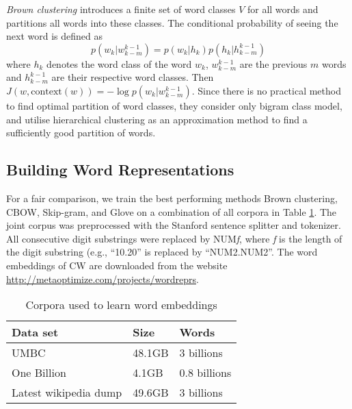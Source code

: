 \textit{Brown clustering} introduces a finite set of word classes $V$ for all words and partitions all words into these classes. The conditional probability of seeing the next word is defined as
\begin{equation}
p(w_k | w_{k - m}^{k -1}) = p(w_k | h_k) p(h_k | h_{k - m}^{k -1})
\end{equation}
where $h_k$ denotes the word class of the word $w_k$, $w_{k - m}^{k -1}$ are the previous $m$ words and $h_{k - m}^{k -1}$ are their respective word classes. Then $J(w, \text{context}(w)) = - \log p(w_k | w_{k - m}^{k -1}) $. Since there is no practical method to find optimal partition of word classes, they consider only bigram class model, and utilise hierarchical clustering as an approximation method to find a sufficiently good partition of words. 

\subsection{Building Word Representations}
\label{buildingWordRep}
For a fair comparison, we train the best performing methods Brown clustering, CBOW, Skip-gram, and Glove on a combination of all corpora in Table \ref{wordEmbedCorpora}. The joint corpus was preprocessed with the Stanford sentence splitter and tokenizer. All consecutive digit substrings were replaced by NUM\textit{f}, where \textit{f} is the length of the digit substring (e.g., ``10.20'' is replaced by ``NUM2.NUM2''. The word embeddings of CW are downloaded from the website \url{http://metaoptimize.com/projects/wordreprs}.

\begin{table}[h]
\begin{center}
\begin{small}
\begin{tabular}{lll}
\hline
\textbf{Data set} & \textbf{Size} & \textbf{Words} \\ \hline
UMBC 	& 48.1GB & 3 billions \\
One Billion 	& 4.1GB & 0.8 billions  \\
Latest wikipedia dump & 49.6GB & 3 billions \\ \hline
\end{tabular}
\end{small}
\caption{Corpora used to learn word embeddings}
\label{wordEmbedCorpora}
\end{center}
\end{table}

